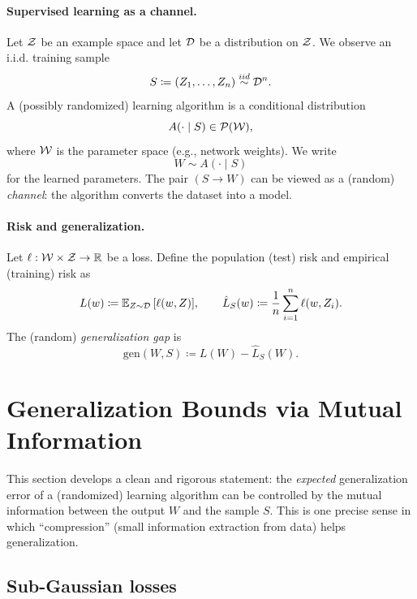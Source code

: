 \documentclass{article}
\numberwithin{equation}{section}
\newcommand{\mathify}[1]{\ifmmode{#1}\else\mbox{$#1$}\fi}
\newcommand{\Esub}[2]{\mathify{\mathbb{E}_{#1}\left[#2\right]}}
\newcommand{\iid}{\stackrel{iid}{\sim}}
\newcommand{\field}[1]{\mathbb{#1}}
\newcommand{\fR}{\field{R}} %
\newcommand{\cD}{{\cal D}}
\newcommand{\cP}{{\cal P}}
\newcommand{\cW}{{\cal W}}
\newcommand{\cZ}{{\cal Z}}
\begin{document}
\paragraph{Supervised learning as a channel.}
Let $\cZ$ be an example space and let $\cD$ be a distribution on $\cZ$.
We observe an i.i.d. training sample
\begin{equation}
    S \coloneqq (Z_1,\dots,Z_n) \iid \cD^n.
\end{equation}
A (possibly randomized) learning algorithm is a conditional distribution
\begin{equation}
    A(\cdot\mid S) \in \cP(\cW),
\end{equation}
where $\cW$ is the parameter space (e.g., network weights).
We write
\begin{equation}
    W \sim A(\cdot\mid S)
\end{equation}
for the learned parameters.
The pair $(S\to W)$ can be viewed as a (random) \emph{channel}: the algorithm converts the dataset into a model.

\paragraph{Risk and generalization.}
Let $\ell: \cW\times\cZ\to\fR$ be a loss.
Define the population (test) risk and empirical (training) risk as
\begin{equation}
    L(w) \coloneqq \Esub{Z\sim\cD}{\ell(w,Z)},
    \qquad
    \hat L_S(w) \coloneqq \frac1n\sum_{i=1}^n \ell(w,Z_i).
\end{equation}
The (random) \emph{generalization gap} is
\begin{equation}
    \mathrm{gen}(W,S) \coloneqq L(W) - \hat L_S(W).
\end{equation}

\section{Generalization Bounds via Mutual Information}
\label{sec:mi-generalization}

This section develops a clean and rigorous statement: the \emph{expected} generalization error of a (randomized) learning algorithm can be controlled by the mutual information between the output $W$ and the sample $S$.
This is one precise sense in which ``compression'' (small information extraction from data) helps generalization.

\subsection{Sub-Gaussian losses}
\end{document}

